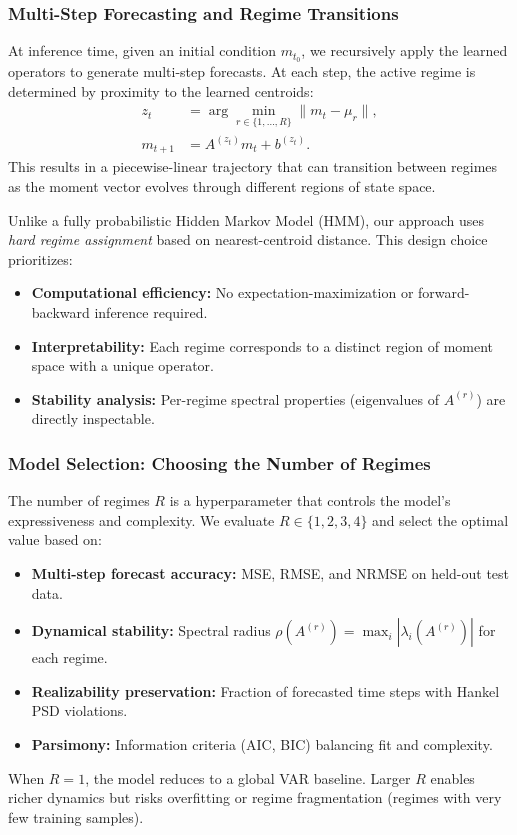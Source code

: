 \documentclass[journal, onecolumn]{IEEEtran}
\begin{document}
\subsubsection{Multi-Step Forecasting and Regime Transitions}

At inference time, given an initial condition $m_{t_0}$, we recursively apply the learned operators to generate multi-step forecasts. At each step, the active regime is determined by proximity to the learned centroids:
\begin{align}
z_t &= \arg\min_{r \in \{1, \dots, R\}} \|m_t - \mu_r\|, \\
m_{t+1} &= A^{(z_t)} m_t + b^{(z_t)}.
\end{align}
This results in a piecewise-linear trajectory that can transition between regimes as the moment vector evolves through different regions of state space.

Unlike a fully probabilistic Hidden Markov Model (HMM), our approach uses \emph{hard regime assignment} based on nearest-centroid distance. This design choice prioritizes:
\begin{itemize}
    \item \textbf{Computational efficiency:} No expectation-maximization or forward-backward inference required.
    \item \textbf{Interpretability:} Each regime corresponds to a distinct region of moment space with a unique operator.
    \item \textbf{Stability analysis:} Per-regime spectral properties (eigenvalues of $A^{(r)}$) are directly inspectable.
\end{itemize}

\subsubsection{Model Selection: Choosing the Number of Regimes}

The number of regimes $R$ is a hyperparameter that controls the model's expressiveness and complexity. We evaluate $R \in \{1, 2, 3, 4\}$ and select the optimal value based on:
\begin{itemize}
    \item \textbf{Multi-step forecast accuracy:} MSE, RMSE, and NRMSE on held-out test data.
    \item \textbf{Dynamical stability:} Spectral radius $\rho(A^{(r)}) = \max_i |\lambda_i(A^{(r)})|$ for each regime.
    \item \textbf{Realizability preservation:} Fraction of forecasted time steps with Hankel PSD violations.
    \item \textbf{Parsimony:} Information criteria (AIC, BIC) balancing fit and complexity.
\end{itemize}
When $R=1$, the model reduces to a global VAR baseline. Larger $R$ enables richer dynamics but risks overfitting or regime fragmentation (regimes with very few training samples).
\end{document}
